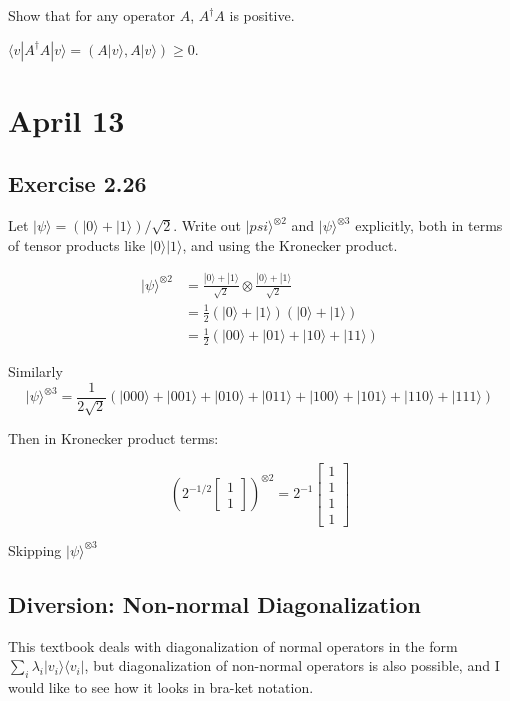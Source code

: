 \documentclass[]{article}
\newcommand{\bra}[1]{\langle #1 |}
\newcommand{\ket}[1]{| #1 \rangle}
\begin{document}
Show that for any operator $A$, $A^\dagger A$ is positive.

$\bra{v}A^\dagger A\ket{v} = (A\ket{v}, A\ket{v}) \geq 0$.

\section{April 13}

\subsection{Exercise 2.26}
Let $\ket{\psi}=(\ket{0}+\ket{1})/\sqrt{2}$. Write out $\ket{psi}^{\otimes 2}$ and $\ket{\psi}^{\otimes 3}$ explicitly, both in terms of tensor products like $\ket{0}\ket{1}$, and using the Kronecker product.

\begin{align*}
\ket{\psi}^{\otimes 2}
&= \frac{\ket{0} + \ket{1}}{\sqrt{2}} \otimes \frac{\ket{0} + \ket{1}}{\sqrt{2}}
\\&= \frac{1}{2}(\ket{0} + \ket{1})(\ket{0} + \ket{1})
\\&= \frac{1}{2}(\ket{00}+\ket{01}+\ket{10}+\ket{11})
\end{align*}

Similarly
\[\ket{\psi}^{\otimes 3} = \frac{1}{2\sqrt{2}}(\ket{000}+\ket{001}+\ket{010}+\ket{011} + \ket{100}+\ket{101}+\ket{110}+\ket{111})\]

Then in Kronecker product terms:

\[
\left(2^{-1/2}\left[\begin{matrix}1\\1\end{matrix}\right]\right)^{\otimes 2} = 2^{-1}\left[\begin{matrix}1\\1\\1\\1\end{matrix}\right]
\]

Skipping $\ket{\psi}^{\otimes 3}$

\subsection{Diversion: Non-normal Diagonalization}

This textbook deals with diagonalization of normal operators in the form $\sum_i \lambda_i\ket{v_i}\bra{v_i}$, but diagonalization of non-normal operators is also possible, and I would like to see how it looks in bra-ket notation.
\end{document}
